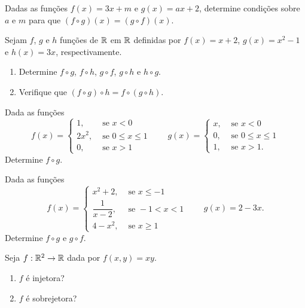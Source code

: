 \documentclass[12pt]{exam}
\begin{document}
    \questao{} Dadas as fun\c{c}\~oes $f(x) = 3x + m$ e $g(x) = ax + 2$, determine condi\c{c}\~oes sobre $a$ e $m$ para que $(f\circ g)(x) = (g\circ f)(x)$.

    \vspace{.3cm}

    \questao{} Sejam $f$, $g$ e $h$ fun\c{c}\~oes de $\mathbb{R}$ em $\mathbb{R}$ definidas por $f(x) = x + 2$, $g(x) = x^2 - 1$ e $h(x) = 3x$, respectivamente.
    \begin{enumerate}[label={\alph*})]
        \item Determine $f \circ g$, $f \circ h$, $g \circ f$, $g \circ h$ e $h \circ g$.
        \item Verifique que $(f \circ g)\circ h = f \circ (g \circ h)$.
    \end{enumerate}

    \vspace{.3cm}

    \questao{} Dada as fun\c{c}\~oes
    \[
        f(x) = \begin{cases}
            1, & \mbox{ se } x < 0\\
            2x^2, & \mbox{ se } 0 \le x \le 1\\
            0, & \mbox{ se } x > 1
        \end{cases} \qquad g(x) = \begin{cases}
            x, & \mbox{ se } x < 0\\
            0, & \mbox{ se } 0 \le x \le 1\\
            1, & \mbox{ se } x > 1.
        \end{cases}
    \]
    Determine $f\circ g$.

    \vspace{.3cm}

    \questao{} Dada as fun\c{c}\~oes
    \[
        f(x) = \begin{cases}
            x^2 + 2, & \mbox{ se } x \le -1\\
            \dfrac{1}{x - 2}, & \mbox{ se } -1 < x < 1\\
            4 - x^2, & \mbox{ se } x \ge 1
        \end{cases} \qquad g(x) = 2 - 3x.
    \]
    Determine $f\circ g$ e $g \circ f$.

    \newpage

    \questao{} Seja $f: \mathbb{R}^2 \to \mathbb{R}$ dada por $f(x,y) = xy$.
    \begin{enumerate}[label={\alph*})]
        \item $f$ {\'e} injetora?
        \item $f$ {\'e} sobrejetora?
    \end{enumerate}
\end{document}
